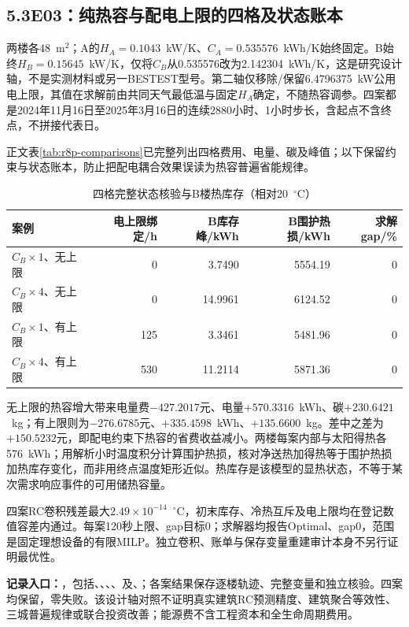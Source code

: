 \subsection*{5.3\quad E03：纯热容与配电上限的四格及状态账本}
两楼各48~m$^2$；A的$H_A=0.1043$~kW/K、$C_A=0.535576$~kWh/K始终固定。B始终$H_B=0.15645$~kW/K，仅将$C_B$从0.535576改为2.142304~kWh/K，这是研究设计轴，不是实测材料或另一BESTEST型号。第二轴仅移除/保留6.4796375~kW公用电上限，其值在求解前由共同天气最低温与固定$H_A$确定，不随热容调参。四案都是2024年11月16日至2025年3月16日的连续2880小时、1小时步长，含起点不含终点，不拼接代表日。

正文表\ref{tab:r8p-comparisons}已完整列出四格费用、电量、碳及峰值；以下保留约束与状态账本，防止把配电耦合效果误读为热容普遍省能规律。

\begin{table}[H]
\centering
\caption{四格完整状态核验与B楼热库存（相对20~$^\circ$C）}
\begin{tabularx}{\linewidth}{@{}Yrrrr@{}}
\toprule
案例 & 电上限绑定/h & B库存峰/kWh & B围护热损/kWh & 求解gap/\%\\\midrule
$C_B\times1$、无上限 & 0 & 3.7490 & 5554.19 & 0\\
$C_B\times4$、无上限 & 0 & 14.9961 & 6124.52 & 0\\
$C_B\times1$、有上限 & 125 & 3.3461 & 5481.96 & 0\\
$C_B\times4$、有上限 & 530 & 11.2114 & 5871.36 & 0\\
\bottomrule
\end{tabularx}
\end{table}

无上限的热容增大带来电量费$-427.2017$元、电量$+570.3316$~kWh、碳$+230.6421$~kg；有上限则为$-276.6785$元、$+335.4598$~kWh、$+135.6600$~kg。差中之差为$+150.5232$元，即配电约束下热容的省费收益减小。两楼每案内部与太阳得热各576~kWh；用解析小时温度积分计算围护热损，核对净送热加得热等于围护热损加热库存变化，而非用终点温度矩形近似。热库存是该模型的显热状态，不等于某次需求响应事件的可用储热容量。

四案RC卷积残差最大$2.49\times10^{-14}$~$^\circ$C，初末库存、冷热互斥及电上限均在登记数值容差内通过。每案120秒上限、gap目标0；求解器均报告Optimal、gap0，范围是固定理想设备的有限MILP。独立卷积、账单与保存变量重建审计本身不另行证明最优性。

\noindent\textbf{记录入口：}，包括、、、、及、；各案结果保存逐楼轨迹、完整变量和独立核验。四案均保留，零失败。该设计轴对照不证明真实建筑RC预测精度、建筑聚合等效性、三城普遍规律或联合投资改善；能源费不含工程资本和全生命周期费用。

